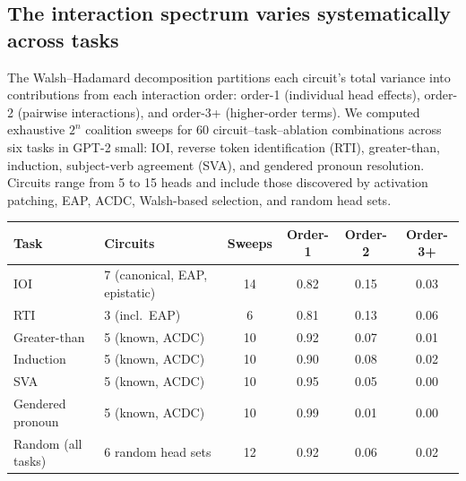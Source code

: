 %
%

\subsection{The interaction spectrum varies systematically across tasks}
\label{sec:energy-spectrum}

The Walsh--Hadamard decomposition partitions each circuit's total
variance into contributions from each interaction order: order-1
(individual head effects), order-2 (pairwise interactions), and
order-3+ (higher-order terms). We computed exhaustive $2^n$ coalition
sweeps for 60 circuit--task--ablation combinations across six tasks in
GPT-2 small: IOI, reverse token identification (RTI), greater-than,
induction, subject-verb agreement (SVA), and gendered pronoun
resolution. Circuits range from 5 to 15 heads and include those
discovered by activation patching, EAP, ACDC, Walsh-based selection,
and random head sets.

\medskip

{\small
\begin{tabular}{llcccc}
\toprule
Task & Circuits & Sweeps & Order-1 & Order-2 & Order-3+ \\
\midrule
IOI            & 7 (canonical, EAP, epistatic) & 14 & 0.82 & 0.15 & 0.03 \\
RTI            & 3 (incl.\ EAP)               &  6 & 0.81 & 0.13 & 0.06 \\
Greater-than   & 5 (known, ACDC)               & 10 & 0.92 & 0.07 & 0.01 \\
Induction      & 5 (known, ACDC)               & 10 & 0.90 & 0.08 & 0.02 \\
SVA            & 5 (known, ACDC)               & 10 & 0.95 & 0.05 & 0.00 \\
Gendered pronoun & 5 (known, ACDC)             & 10 & 0.99 & 0.01 & 0.00 \\
\midrule
Random (all tasks) & 6 random head sets        & 12 & 0.92 & 0.06 & 0.02 \\
\bottomrule
\end{tabular}
}

